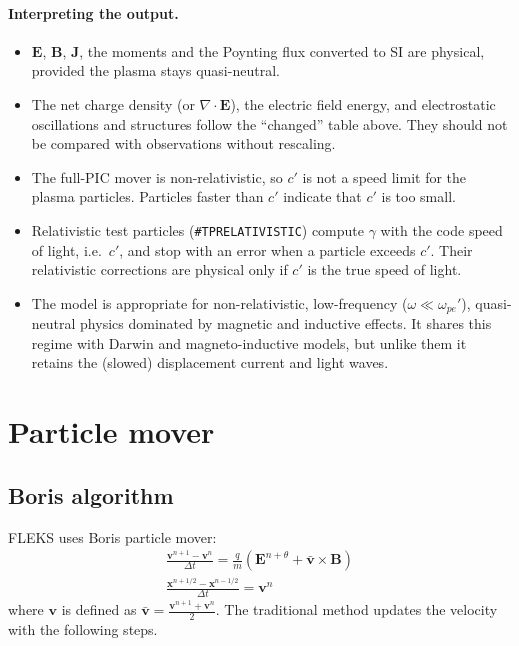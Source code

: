 \documentclass[a4paper, 11pt]{article}
\begin{document}
\paragraph{Interpreting the output.}
\begin{itemize}
  \item $\mathbf{E}$, $\mathbf{B}$, $\mathbf{J}$, the moments and the Poynting flux converted to SI are physical, provided the plasma stays quasi-neutral.
  \item The net charge density (or $\nabla\cdot\mathbf{E}$), the electric field energy, and electrostatic oscillations and structures follow the ``changed'' table above. They should not be compared with observations without rescaling.
  \item The full-PIC mover is non-relativistic, so $c'$ is not a speed limit for the plasma particles. Particles faster than $c'$ indicate that $c'$ is too small.
  \item Relativistic test particles (\texttt{\#TPRELATIVISTIC}) compute $\gamma$ with the code speed of light, i.e.\ $c'$, and stop with an error when a particle exceeds $c'$. Their relativistic corrections are physical only if $c'$ is the true speed of light.
  \item The model is appropriate for non-relativistic, low-frequency ($\omega \ll \omega_{pe}'$), quasi-neutral physics dominated by magnetic and inductive effects. It shares this regime with Darwin and magneto-inductive models, but unlike them it retains the (slowed) displacement current and light waves.
\end{itemize}

\section{Particle mover}

\subsection{Boris algorithm}

FLEKS uses Boris particle mover: 
\begin{eqnarray}
\frac{\mathbf{v}^{n+1} - \mathbf{v}^{n}}{\Delta t} = \frac{q}{m}(\mathbf{E}^{n+\theta} + \bar{\mathbf{v}}\times\mathbf{B}) \\
\frac{\mathbf{x}^{n+1/2} - \mathbf{x}^{n-1/2}}{\Delta t} = \mathbf{v}^n
\end{eqnarray}
where $\mathbf{v}$ is defined as $\bar{\mathbf{v}} = \frac{\mathbf{v}^{n+1} + \mathbf{v}^{n}}{2}$. The traditional method updates the velocity with the following steps.
\end{document}
